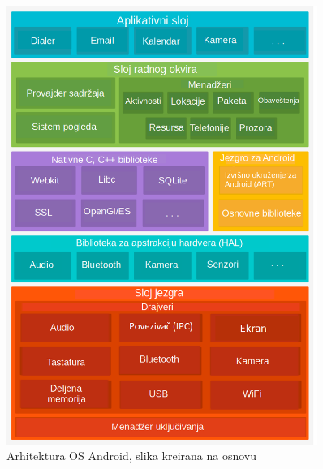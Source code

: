 \documentclass[android.tex]{subfiles}
\begin{document}
\begin{figure}[!ht]
  \centering
  \includegraphics[width=0.9\textwidth]{arhitekturaSrp.png}
  \caption{Arhitektura OS Android, slika kreirana na osnovu \cite{sajt:androidDevelopersArhitektura}}
  \label{fig:arhitektura}
\end{figure}
\end{document}
